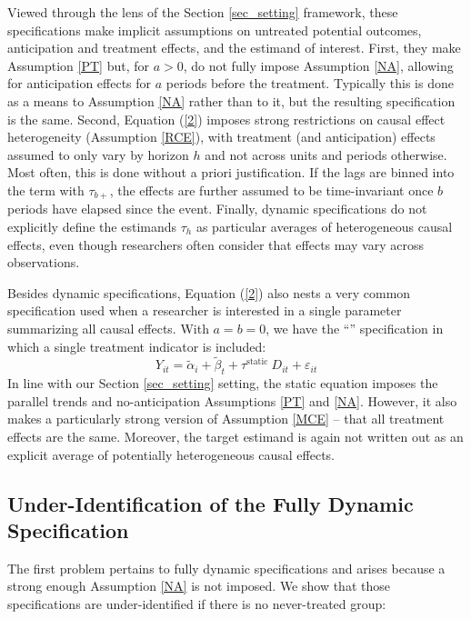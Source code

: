 \documentclass[12pt]{article}
\newcommand{\highlightB}[1]{{\emph{\color{MyBlue}{#1}}}}
\newcommand{\highlightP}[1]{{\emph{\color{MyPink}{#1}}}}
\theoremstyle{definition}
\begin{document}
Viewed through the lens of the Section \ref{sec_setting} framework, these specifications make implicit assumptions on untreated potential outcomes, anticipation and treatment effects, and the estimand of interest. First, they make Assumption \ref{PT} but, for $a > 0$, do not fully impose Assumption \ref{NA}, allowing for anticipation effects for $a$ periods before the treatment. Typically this is done as a means to \highlightP{test} Assumption \ref{NA} rather than to \highlightP{relax} it, but the resulting specification is the same. Second, Equation (\ref{2}) imposes strong restrictions on causal effect heterogeneity (Assumption \ref{RCE}), with treatment (and anticipation) effects assumed to only vary by horizon $h$ and not across units and periods otherwise. Most often, this is done without a priori justification. If the lags are binned into the term with $\tau_{b+}$, the effects are further assumed to be time-invariant once $b$ periods have elapsed since the event. Finally, dynamic specifications do not explicitly define the estimands $\tau_h$ as particular averages of heterogeneous causal effects, even though researchers often consider that effects may vary across observations.

Besides dynamic specifications, Equation (\ref{2}) also nests a very common specification used when a researcher is interested in a single parameter summarizing all causal effects. With $a=b=0$, we have the ``\highlightB{static}'' specification in which a single treatment indicator is included:
\begin{equation}
    \label{3}
    Y_{i t}=\tilde{\alpha}_i+\tilde{\beta}_t+\tau^{\text {static }} D_{i t}+\varepsilon_{i t}
\end{equation}
In line with our Section \ref{sec_setting} setting, the static equation imposes the parallel trends and no-anticipation Assumptions \ref{PT} and \ref{NA}. However, it also makes a particularly strong version of Assumption \ref{MCE} -- that all treatment effects are the same. Moreover, the target estimand is again not written out as an explicit average of potentially heterogeneous causal effects.

\subsection{Under-Identification of the Fully Dynamic Specification}

The first problem pertains to fully dynamic specifications and arises because a strong enough Assumption \ref{NA} is not imposed. We show that those specifications are under-identified if there is no never-treated group:
\end{document}
